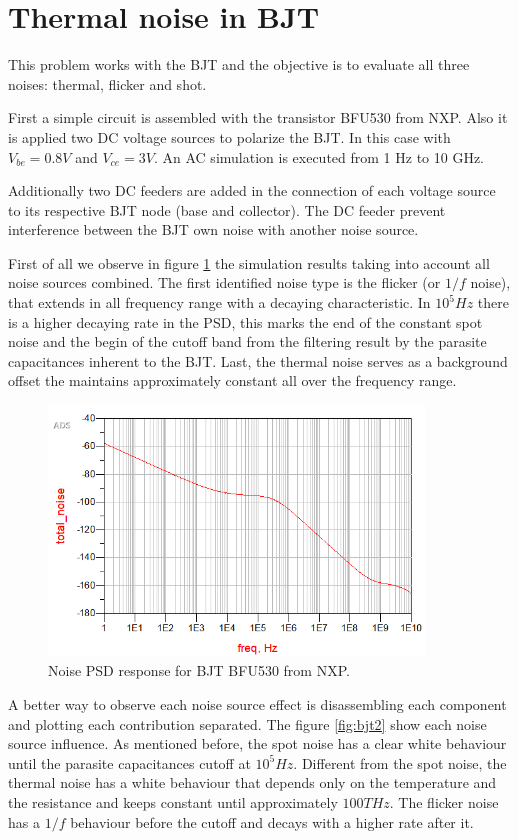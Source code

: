 \section{Thermal noise in BJT}

This problem works with the BJT and the objective is to evaluate all three noises: thermal, flicker and shot.

First a simple circuit is assembled with the transistor BFU530 from NXP. Also it is applied two DC voltage sources to polarize the BJT. In this case with $V_{be} = 0.8 V$ and $V_{ce} = 3 V$. An AC simulation is executed from 1 Hz to 10 GHz.

Additionally two DC feeders are added in the connection of each voltage source to its respective BJT node (base and collector). The DC feeder prevent interference between the BJT own noise with another noise source.

First of all we observe in figure \ref{fig:bjt1} the simulation results taking into account all noise sources combined. The first identified noise type is the flicker (or $1/f$ noise), that extends in all frequency range with a decaying characteristic. In $10^5 Hz$ there is a higher decaying rate in the PSD, this marks the end of the constant spot noise and the begin of the cutoff band from the filtering result by the parasite capacitances inherent to the BJT. Last, the thermal noise serves as a background offset the maintains approximately constant all over the frequency range. 

\begin{figure}[H] 
\centering
\includegraphics[width=10cm]{images/total_noise.png}
\caption{Noise PSD response for BJT BFU530 from NXP.}
\label{fig:bjt1} 
\end{figure}

A better way to observe each noise source effect is disassembling each component and plotting each contribution separated. The figure \ref{fig:bjt2} show each noise source influence. As mentioned before, the spot noise has a clear white behaviour until the parasite capacitances cutoff at $10^5 Hz$. Different from the spot noise, the thermal noise has a white behaviour that depends only on the temperature and the resistance and keeps constant until approximately $100 THz$. The flicker noise has a $1/f$ behaviour before the cutoff and decays with a higher rate after it.

